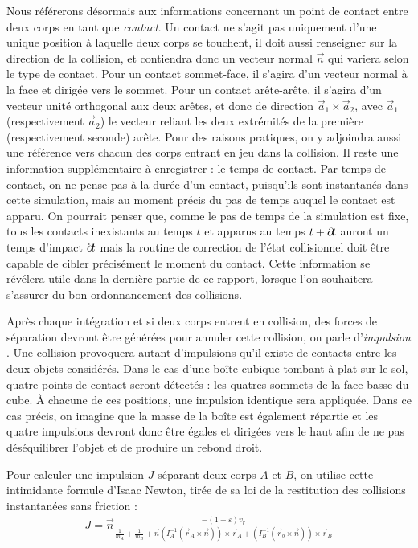 Nous référerons désormais aux informations concernant un point de
contact entre deux corps en tant que \textit{contact}. Un contact ne
s'agit pas uniquement d'une unique position à laquelle deux corps se
touchent, il doit aussi renseigner sur la direction de la collision,
et contiendra donc un vecteur normal $\vec{n}$ qui variera selon le
type de contact. Pour un contact sommet-face, il s'agira d'un vecteur
normal à la face et dirigée vers le sommet. Pour un contact
arête-arête, il s'agira d'un vecteur unité orthogonal aux deux arêtes,
et donc de direction $\vec{a}_1 \times \vec{a}_2$, avec $\vec{a}_1$
(respectivement $\vec{a}_2$) le vecteur reliant les deux extrémités de
la première (respectivement seconde) arête. Pour des raisons
pratiques, on y adjoindra aussi une référence vers chacun des corps
entrant en jeu dans la collision. Il reste une information
supplémentaire à enregistrer : le temps de contact. Par temps de
contact, on ne pense pas à la durée d'un contact, puisqu'ils sont
instantanés dans cette simulation, mais au moment précis du pas de
temps auquel le contact est apparu. On pourrait penser que, comme le
pas de temps de la simulation est fixe, tous les contacts inexistants
au temps $t$ et apparus au temps $t + \partial \! t$ auront un temps
d'impact $\partial \! t$ mais la routine de correction de l'état
collisionnel doit être capable de cibler précisément le moment du
contact. Cette information se révélera utile dans la dernière partie
de ce rapport, lorsque l'on souhaitera s'assurer du bon ordonnancement
des collisions.

Après chaque intégration et si deux corps entrent en collision, des
forces de séparation devront être générées pour annuler cette
collision, on parle d'\textit{impulsion} \cite{mirtich}. Une collision
provoquera autant d'impulsions qu'il existe de contacts entre les
deux objets considérés. Dans le cas d'une boîte cubique tombant à plat
sur le sol, quatre points de contact seront détectés : les quatres
sommets de la face basse du cube. \`A chacune de ces positions, une
impulsion identique sera appliquée. Dans ce cas précis, on imagine que
la masse de la boîte est également répartie et les quatre impulsions
devront donc être égales et dirigées vers le haut afin de ne pas
déséquilibrer l'objet et de produire un rebond droit.

Pour calculer une impulsion $J$ séparant deux corps $A$ et $B$, on
utilise cette intimidante formule d'Isaac Newton, tirée de sa loi de
la restitution des collisions instantanées sans friction :
\begin{align*}
J = \vec{n} 
  \frac{-(1 + \varepsilon) v_r}{
  \frac{1}{m_A} +
  \frac{1}{m_B} +
  \vec{n}
  (I_A^{-1} (\vec{r}_A \times \vec{n})) \times \vec{r}_A +
  (I_B^{-1} (\vec{r}_b \times \vec{n})) \times \vec{r}_B
}
\end{align*}

